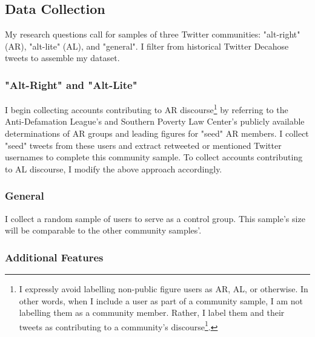 \documentclass[acmlarge, screen, authorversion]{acmart}
\begin{document}
\subsection{Data Collection}

My research questions call for samples of three Twitter communities: "alt-right" (AR), "alt-lite" (AL), and "general". I filter from historical Twitter Decahose tweets to assemble my dataset.

\subsubsection{"Alt-Right" and "Alt-Lite"}

I begin collecting accounts contributing to AR discourse\footnote{I expressly
avoid labelling non-public figure users as AR, AL, or otherwise. In other words,
when I include a user as part of a community sample, I am not labelling them as
a community member. Rather, I label them and their tweets as contributing to a
community's discourse\footnote{In some ways, I follow
\citet{salazarAltRightCommunityDiscourse2018}'s suggestion to examine the
"alt-right" as a \textit{community of discourse}}. 	} by referring to the
Anti-Defamation League's \cite{anti-defamationleagueAltRightAlt} and Southern
Poverty Law Center's \cite{southernpovertylawcenterAltRight} publicly available
determinations of AR groups and leading figures for "seed" AR members. I collect
"seed" tweets from these users and extract retweeted or mentioned Twitter
usernames to complete this community sample.
To collect accounts contributing to AL discourse, I modify the above approach accordingly.

\subsubsection{General}

I collect a random sample of users to serve as a control group. This sample's size will be comparable to the other community samples'.




\subsubsection{Additional Features}
\end{document}
